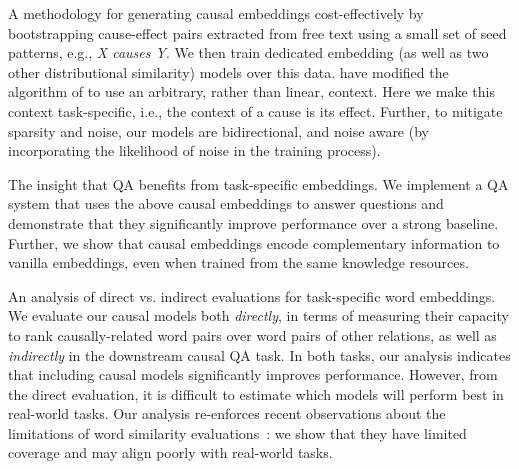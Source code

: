 {} 
A methodology for generating causal embeddings cost-effectively by bootstrapping cause-effect pairs extracted from free text using a small set of seed patterns, e.g., {\em X causes Y}. 
We then train dedicated embedding (as well as two other distributional similarity) models over this data. \citet{levy2014dependency} have modified the algorithm of\citet{mikolov2013distributed} to use an arbitrary, rather than linear, context. Here we make this context task-specific, i.e., the context of a cause is its effect.
Further, to mitigate sparsity and noise, our models are bidirectional, and noise aware (by incorporating the likelihood of noise in the training process). 

{} The insight that QA benefits from task-specific embeddings. %
We implement a QA system that uses the above causal embeddings to answer questions and demonstrate that they significantly improve performance over a strong baseline. Further, we show that causal embeddings encode complementary information to vanilla embeddings, even when trained from the same knowledge resources. 

{} An analysis of direct vs. indirect evaluations for task-specific word embeddings. 
We evaluate our causal models both  {\em directly}, in terms of measuring their capacity to rank causally-related word pairs over word pairs of other relations, as well as {\em indirectly} in the downstream causal QA task. 
In both tasks, our analysis indicates that including causal models significantly improves performance. 
However, from the direct evaluation, it is difficult to estimate which models will perform best in real-world tasks. Our analysis re-enforces recent observations about the limitations of word similarity evaluations~\cite{faruqui2016problems}: we show that they have limited coverage and may align poorly with real-world tasks.

